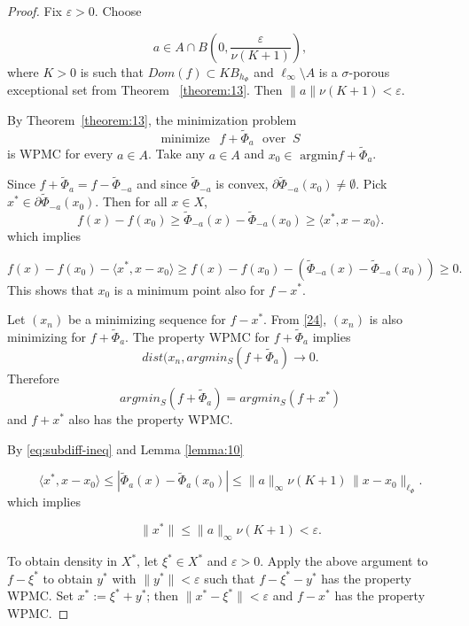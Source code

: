\documentclass[12pt]{article}
\theoremstyle{thmstyleone}%
\theoremstyle{thmstyletwo}%
\theoremstyle{thmstylethree}%
\begin{document}
{{%

\begin{proof}
Fix $\varepsilon>0$.  
Choose 


\[
a\in A\cap B\left(0,\frac{\varepsilon}{\nu (K+1)}\right),
\]
where $K>0$ is such that $Dom(f)\subset KB_{h_\Phi}$ and $\ell_\infty \setminus A$ is a $\sigma$-porous exceptional set from
Theorem ~\ref{theorem:13}. Then $\|a\|\nu(K+1)< \varepsilon$.
  
By Theorem~\ref{theorem:13}, the 
minimization problem 
$$
  \mbox {minimize }\ \ f+\widetilde{\Phi}_a \ \ \ \mbox{over }\ S
$$
 is WPMC for every $a\in A$. Take any $a\in A$ and  $x_0\in \mbox{ argmin} f+\widetilde{\Phi}_a$.
 
 Since $f+\widetilde{\Phi}_a =f-\widetilde{\Phi}_{-a}$ 
and since $\widetilde{\Phi}_{-a}$ is convex, $\partial\widetilde{\Phi}_{-a}(x_0)\neq\emptyset$. Pick $x^*\in\partial\widetilde{\Phi}_{-a}(x_0)$.  
Then for all $x\in X$,
\begin{equation}\label{eq:subdiff-ineq}
   f(x)-f(x_0)
   \ge \widetilde{\Phi}_{-a}(x)-\widetilde{\Phi}_{-a}(x_0)
   \ge \langle x^*,x-x_0\rangle .
\end{equation}
which implies

\begin{equation}\label{24}
f(x)-f(x_0) - \langle x^*,x-x_0\rangle \ge f(x)-f(x_0) - 
( \widetilde{\Phi}_{-a}(x)-\widetilde{\Phi}_{-a}(x_0)) \ge 0.
\end{equation}
This shows that $x_0$ is a minimum point also for $f-x^*$.

Let $(x_n)$ be a minimizing sequence for $f-x^*$.  
From \eqref{24}, $(x_n)$ is also minimizing for $f+\widetilde{\Phi}_a$.  
The property WPMC for $f+\widetilde{\Phi}_a$ implies 
$$
dist(x_n,argmin_S(f+\widetilde{\Phi}_a)\to 0.
$$
Therefore 
$$
argmin_S(f+\widetilde{\Phi}_a)=argmin_S(f+x^*)
$$
and $f+x^*$ also has the property WPMC.

By \ref{eq:subdiff-ineq} and Lemma \ref{lemma:10}	

\[
\langle x^*,x-x_0\rangle \le |\tilde \Phi_a(x)-\tilde \Phi_a(x_0)| 
   \le \|a\|_\infty \nu(K+1)\,\|x-x_0\|_{\ell_\Phi}.
\]
which implies
 
\[
\|x^*\|\le \|a\|_\infty \nu(K+1) < \varepsilon.
\]

To obtain density in $X^*$, let $\xi^*\in X^*$ and $\varepsilon>0$.  
Apply the above argument to $f-\xi^*$ to obtain $y^*$ with $\|y^*\|<\varepsilon$ such that 
$f-\xi^*-y^*$ has the property WPMC.  
Set $x^*:=\xi^*+y^*$; then $\|x^*-\xi^*\|<\varepsilon$ and $f-x^*$ has the property WPMC.


\end{proof}}}
\end{document}
